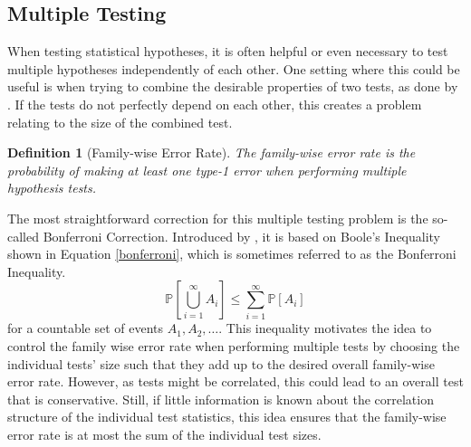 \documentclass[12pt, a4paper]{article}
\theoremstyle{MAstyle} \newtheorem{assumption}{Assumption}[section]
\theoremstyle{MAstyle} \newtheorem{definition}{Definition}[section]
\theoremstyle{MAstyle} \newtheorem{theorem}{Theorem}[section]
\begin{document}
	
		\subsection{Multiple Testing}\label{Multiple_Testing}
			When testing statistical hypotheses, it is often helpful or even necessary to test multiple hypotheses independently of each other. One setting where this could be useful is when trying to combine the desirable properties of two tests, as done by \cite{bugni_permutation_2021}. If the tests do not perfectly depend on each other, this creates a problem relating to the size of the combined test.
			
			\begin{definition}[Family-wise Error Rate]
				The family-wise error rate is the probability of making at least one type-1 error when performing multiple hypothesis tests.
			\end{definition}
		
			The most straightforward correction for this multiple testing problem is the so-called Bonferroni Correction. Introduced by \cite{dunn_multiple_1961}, it is based on Boole's Inequality shown in Equation \ref{bonferroni}, which is sometimes referred to as the Bonferroni Inequality.
			\begin{equation}\label{bonferroni}
				\mathbb{P}\left[\bigcup_{i = 1}^{\infty} A_i\right] \leq \sum_{i = 1}^{\infty} \mathbb{P}\left[A_i\right]
			\end{equation}
			for a countable set of events $A_1, A_2, \dots$.
			This inequality motivates the idea to control the family wise error rate when performing multiple tests by choosing the individual tests' size such that they add up to the desired overall family-wise error rate. However, as tests might be correlated, this could lead to an overall test that is conservative. Still, if little information is known about the correlation structure of the individual test statistics, this idea ensures that the family-wise error rate is at most the sum of the individual test sizes.		
\end{document}
